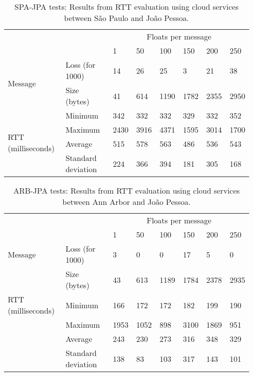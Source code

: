 \begin{table}[]
	\centering
	\begin{tabular}{ll|llllll|}
		&                    & \multicolumn{6}{c|}{Floats per message} \\
		&                    & 1    & 50   & 100  & 150  & 200  & 250  \\ \hline
		\multirow{2}{*}{Message}            & Loss (for 1000)      & 14   & 26   & 25   & 3    & 21   & 38   \\
		& Size (bytes)       & 41   & 614  & 1190 & 1782 & 2355 & 2950 \\ \cline{1-2}
		\multirow{4}{*}{RTT (milliseconds)} & Minimum            & 342  & 332  & 332  & 329  & 332  & 352  \\
		& Maximum            & 2430 & 3916 & 4371 & 1595 & 3014 & 1700 \\
		& Average            & 515  & 578  & 563  & 486  & 536  & 543  \\
		& Standard deviation & 224  & 366  & 394  & 181  & 305  & 168  \\ \hline
	\end{tabular}
	
	\caption{SPA-JPA tests: Results from RTT evaluation using cloud services between S\~{a}o Paulo and Jo\~{a}o Pessoa.}
	\label{tab:sao-jpa}
\end{table}

\begin{table}[]
	\centering
	\begin{tabular}{ll|llllll|}
		&                    & \multicolumn{6}{c|}{Floats per message}  \\
		&                    & 1    & 50   & 100  & 150  & 200  & 250  \\ \hline
		Message             & Loss (for 1000)      & 3    & 0    & 0    & 17   & 5    & 0    \\
		& Size (bytes)       & 43   & 613  & 1189 & 1784 & 2378 & 2935 \\ \cline{1-2}
		RTT (milliseconds) & Minimum            & 166  & 172  & 172  & 182  & 199  & 190  \\
		& Maximum            & 1953 & 1052 & 898  & 3100 & 1869 & 951  \\
		& Average            & 243  & 230  & 273  & 316  & 348  & 329  \\
		& Standard deviation & 138  & 83   & 103  & 317  & 143  & 101  \\ \hline
	\end{tabular}
	
	\caption{ARB-JPA tests: Results from RTT evaluation using cloud services between Ann Arbor and Jo\~{a}o Pessoa.}
	\label{tab:arb-jpa}
\end{table}

